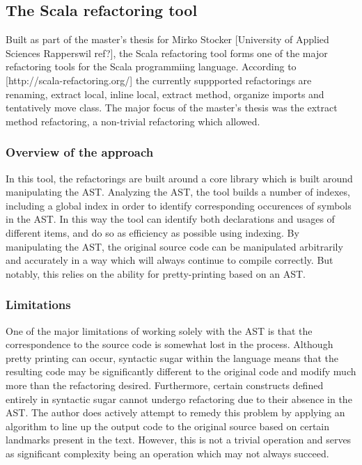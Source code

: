 \subsection{The Scala refactoring tool}
Built as part of the master's thesis for Mirko Stocker [University of Applied Sciences Rapperswil ref?], the Scala refactoring tool forms one of the major refactoring tools for the Scala programmiing language. According to [http://scala-refactoring.org/] the currently suppported refactorings are renaming, extract local, inline local, extract method, organize imports and tentatively move class. The major focus of the master's thesis was the extract method refactoring, a non-trivial refactoring which allowed.

\subsubsection{Overview of the approach}
In this tool, the refactorings are built around a core library which is built around manipulating the AST. Analyzing the AST, the tool builds a number of indexes, including a global index in order to identify corresponding occurences of symbols in the AST. In this way the tool can identify both declarations and usages of different items, and do so as efficiency as possible using indexing. By manipulating the AST, the original source code can be manipulated arbitrarily and accurately in a way which will always continue to compile correctly. But notably, this relies on the ability for pretty-printing based on an AST.

\subsubsection{Limitations}
One of the major limitations of working solely with the AST is that the correspondence to the source code is somewhat lost in the process. Although pretty printing can occur, syntactic sugar within the language means that the resulting code may be significantly different to the original code and modify much more than the refactoring desired. Furthermore, certain constructs defined entirely in syntactic sugar cannot undergo refactoring due to their absence in the AST. The author does actively attempt to remedy this problem by applying an algorithm to line up the output code to the original source based on certain landmarks present in the text. However, this is not a trivial operation and serves as significant complexity being an operation which may not always succeed.

